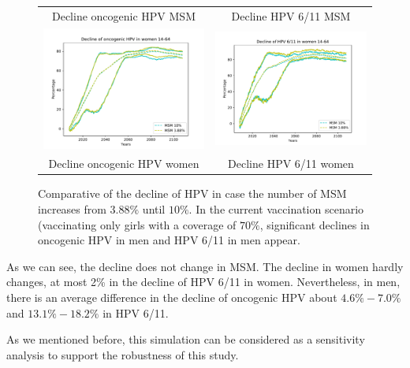 \begin{figure}[!]
\begin{tabular}{cc}
		Decline oncogenic HPV MSM	& Decline HPV 6/11 MSM \\ 
		\includegraphics[width=0.5\linewidth]{IMGs/13.-Aumento_MSM/onco_muj.pdf}	& 
		\includegraphics[width=0.5\linewidth]{IMGs/13.-Aumento_MSM/verr_muj.pdf}  \\ 
		Decline oncogenic HPV women	& Decline HPV 6/11 women \\ 
	\end{tabular} 
	\caption{Comparative of the decline of HPV in case the number of MSM increases from $3.88\%$ until $10\%$. In the current vaccination scenario (vaccinating only girls with a coverage of $70\%$, significant declines in oncogenic HPV in men and HPV 6/11 in men appear.}
	\label{fig:compara_MSM}
\end{figure}

As we can see, the decline does not change in MSM. The decline in women hardly changes, at most 2\% in the decline of HPV 6/11 in women. Nevertheless, in men, there is an average difference in the decline of oncogenic HPV about $4.6\%-7.0\%$ and $13.1\%-18.2\%$ in HPV 6/11.

As we mentioned before, this simulation can be considered as a sensitivity analysis to support the robustness of this study.
